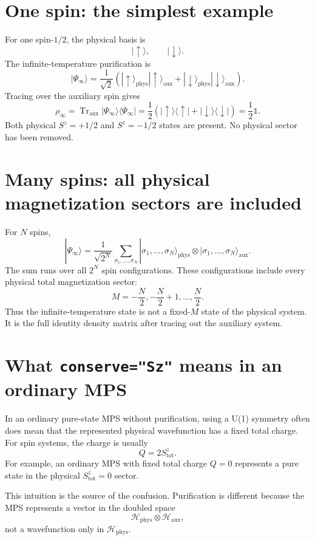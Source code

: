 \documentclass[11pt]{article}
\newcommand{\Tr}{\operatorname{Tr}}
\newcommand{\Id}{\mathbb{1}}
\newcommand{\Hphys}{\mathcal{H}_{\mathrm{phys}}}
\newcommand{\Haux}{\mathcal{H}_{\mathrm{aux}}}
\newcommand{\Q}{Q}
\begin{document}
\section{One spin: the simplest example}

For one spin-\(1/2\), the physical basis is
\[
|\uparrow\rangle,\qquad |\downarrow\rangle.
\]
The infinite-temperature purification is
\[
|\Psi_\infty\rangle
= \frac{1}{\sqrt{2}}
\left(
|\uparrow\rangle_{\mathrm{phys}}|\uparrow\rangle_{\mathrm{aux}}
+
|\downarrow\rangle_{\mathrm{phys}}|\downarrow\rangle_{\mathrm{aux}}
\right).
\]
Tracing over the auxiliary spin gives
\[
\rho_\infty
= \Tr_{\mathrm{aux}}|\Psi_\infty\rangle\langle\Psi_\infty|
= \frac{1}{2}
\left(
|\uparrow\rangle\langle\uparrow|
+
|\downarrow\rangle\langle\downarrow|
\right)
= \frac{1}{2}\Id.
\]
Both physical \(S^z=+1/2\) and \(S^z=-1/2\) states are present. No physical
sector has been removed.

\section{Many spins: all physical magnetization sectors are included}

For \(N\) spins,
\[
|\Psi_\infty\rangle
= \frac{1}{\sqrt{2^N}}
\sum_{\sigma_1,\ldots,\sigma_N}
|\sigma_1,\ldots,\sigma_N\rangle_{\mathrm{phys}}
\otimes
|\sigma_1,\ldots,\sigma_N\rangle_{\mathrm{aux}}.
\]
The sum runs over all \(2^N\) spin configurations. These configurations include
every physical total magnetization sector:
\[
M=-\frac{N}{2},-\frac{N}{2}+1,\ldots,\frac{N}{2}.
\]
Thus the infinite-temperature state is not a fixed-\(M\) state of the physical
system. It is the full identity density matrix after tracing out the auxiliary
system.

\section{What \texttt{conserve="Sz"} means in an ordinary MPS}

In an ordinary pure-state MPS without purification, using a U(1) symmetry often
does mean that the represented physical wavefunction has a fixed total charge.
For spin systems, the charge is usually
\[
\Q = 2 S^z_{\mathrm{tot}}.
\]
For example, an ordinary MPS with fixed total charge \(\Q=0\) represents a pure
state in the physical \(S^z_{\mathrm{tot}}=0\) sector.

This intuition is the source of the confusion. Purification is different because
the MPS represents a vector in the doubled space
\[
\Hphys \otimes \Haux,
\]
not a wavefunction only in \(\Hphys\).
\end{document}
